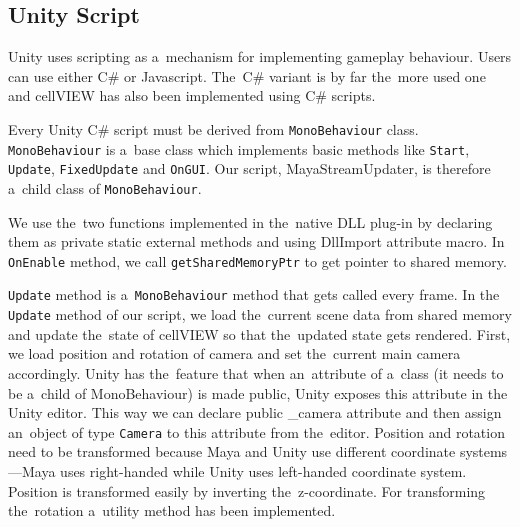 \documentclass[
  digital, %
  table,   %
  nolof,     %
  nolot,     %
  oneside,
]{fithesis3}
\begin{document}
\subsection{Unity Script}
Unity uses scripting as a mechanism for implementing gameplay behaviour. Users can use either C\# or Javascript. The C\# variant is by far the more used one and cellVIEW has also been implemented using C\# scripts.

Every Unity C\# script must be derived from \texttt{MonoBehaviour} class. \texttt{MonoBehaviour} is a base class which implements basic methods like \texttt{Start}, \texttt{Update}, \texttt{FixedUpdate} and \texttt{OnGUI}. Our script, MayaStreamUpdater, is therefore a child class of \texttt{MonoBehaviour}.

We use the two functions implemented in the native DLL plug-in by declaring them as private static external methods and using DllImport attribute macro. In \texttt{OnEnable} method, we call \texttt{getSharedMemoryPtr} to get pointer to shared memory.

\texttt{Update} method is a \texttt{MonoBehaviour} method that gets called every frame. In the \texttt{Update} method of our script, we load the current scene data from shared memory and update the state of cellVIEW so that the updated state gets rendered. First, we load position and rotation of camera and set the current main camera accordingly. Unity has the feature that when an attribute of a class (it needs to be a child of MonoBehaviour) is made public, Unity exposes this attribute in the Unity editor. This way we can declare public \_camera attribute and then assign an object of type \texttt{Camera} to this attribute from the editor. Position and rotation need to be transformed because Maya and Unity use different coordinate systems—Maya uses right-handed while Unity uses left-handed coordinate system. Position is transformed easily by inverting the z-coordinate. For transforming the rotation a utility method has been implemented.
\end{document}
